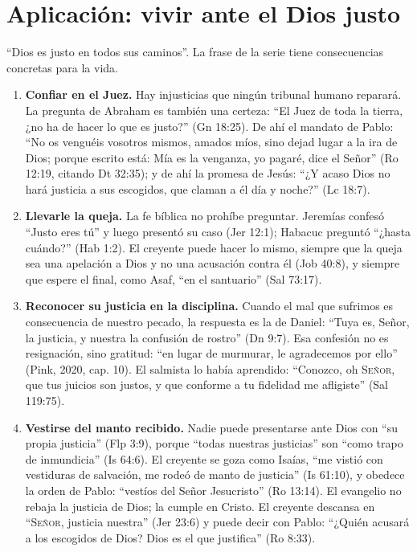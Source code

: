 \documentclass[11pt,letterpaper]{article}
\newcommand{\SENOR}{\textsc{Señor}}
\begin{document}
\section{Aplicación: vivir ante el Dios justo}

``Dios es justo en todos sus caminos''. La frase de la serie tiene consecuencias concretas para la vida.

\begin{enumerate}
\item \textbf{Confiar en el Juez.} Hay injusticias que ningún tribunal humano reparará. La pregunta de Abraham es también una certeza: ``El Juez de toda la tierra, ¿no ha de hacer lo que es justo?'' (Gn 18:25). De ahí el mandato de Pablo: ``No os venguéis vosotros mismos, amados míos, sino dejad lugar a la ira de Dios; porque escrito está: Mía es la venganza, yo pagaré, dice el Señor'' (Ro 12:19, citando Dt 32:35); y de ahí la promesa de Jesús: ``¿Y acaso Dios no hará justicia a sus escogidos, que claman a él día y noche?'' (Lc 18:7).

\item \textbf{Llevarle la queja.} La fe bíblica no prohíbe preguntar. Jeremías confesó ``Justo eres tú'' y luego presentó su caso (Jer 12:1); Habacuc preguntó ``¿hasta cuándo?'' (Hab 1:2). El creyente puede hacer lo mismo, siempre que la queja sea una apelación a Dios y no una acusación contra él (Job 40:8), y siempre que espere el final, como Asaf, ``en el santuario'' (Sal 73:17).

\item \textbf{Reconocer su justicia en la disciplina.} Cuando el mal que sufrimos es consecuencia de nuestro pecado, la respuesta es la de Daniel: ``Tuya es, Señor, la justicia, y nuestra la confusión de rostro'' (Dn 9:7). Esa confesión no es resignación, sino gratitud: ``en lugar de murmurar, le agradecemos por ello'' (Pink, 2020, cap. 10). El salmista lo había aprendido: ``Conozco, oh \SENOR, que tus juicios son justos, y que conforme a tu fidelidad me afligiste'' (Sal 119:75).

\item \textbf{Vestirse del manto recibido.} Nadie puede presentarse ante Dios con ``su propia justicia'' (Flp 3:9), porque ``todas nuestras justicias'' son ``como trapo de inmundicia'' (Is 64:6). El creyente se goza como Isaías, ``me vistió con vestiduras de salvación, me rodeó de manto de justicia'' (Is 61:10), y obedece la orden de Pablo: ``vestíos del Señor Jesucristo'' (Ro 13:14). El evangelio no rebaja la justicia de Dios; la cumple en Cristo. El creyente descansa en ``\SENOR, justicia nuestra'' (Jer 23:6) y puede decir con Pablo: ``¿Quién acusará a los escogidos de Dios? Dios es el que justifica'' (Ro 8:33).


\end{enumerate}
\end{document}
